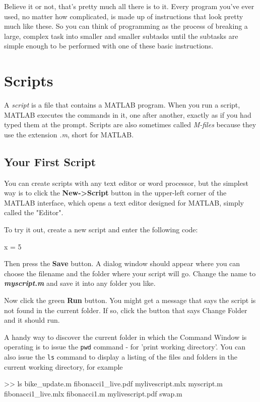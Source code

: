 \documentclass[../../book.tex]{subfiles}
\begin{document}
Believe it or not, that's pretty much all there is to it.  Every
program you've ever used, no matter how complicated, is made up of
instructions that look pretty much like these.  So you can think of
programming as the process of breaking a large, complex task
into smaller and smaller subtasks until the subtasks are
simple enough to be performed with one of these basic instructions.

\section{Scripts}

A \emph{script} is a file that contains a MATLAB program. When you run a script, MATLAB executes the commands in it, one after another, exactly as if you had typed them at the prompt. Scripts are
also sometimes called \emph{M-files} because they use the extension \emph{.m}, short for MATLAB.


\subsection{Your First Script}

You can create scripts with any text editor or word processor, but the simplest way is to click the \textbf{New->Script} button in the upper-left corner of the MATLAB interface, which opens a text editor designed for MATLAB, simply called the "Editor".

To try it out, create a new script and enter the following code:

\begin{code}
x = 5
\end{code}

Then press the \textbf{Save} button.  A dialog window should appear where you can choose the filename and the folder where your script will go.
Change the name to \textbf{\emph{myscript.m}} and save it into any folder you like.

Now click the green \textbf{Run} button.  You might get a message that says the script is not found in the current folder.
If so, click the button that says Change Folder and it should run.  

A handy way to discover the current folder in which the Command Window is operating is to issue the \lstinline{pwd} command - for 'print working directory'.  You can also issue the \lstinline{ls} command to display a listing of the files and folders in the current working directory, for example
\begin{code}
  >> ls
bike_update.m	     fibonacci1_live.pdf  mylivescript.mlx  myscript.m
fibonacci1_live.mlx  fibonacci1.m	  mylivescript.pdf  swap.m
\end{code}
\end{document}
